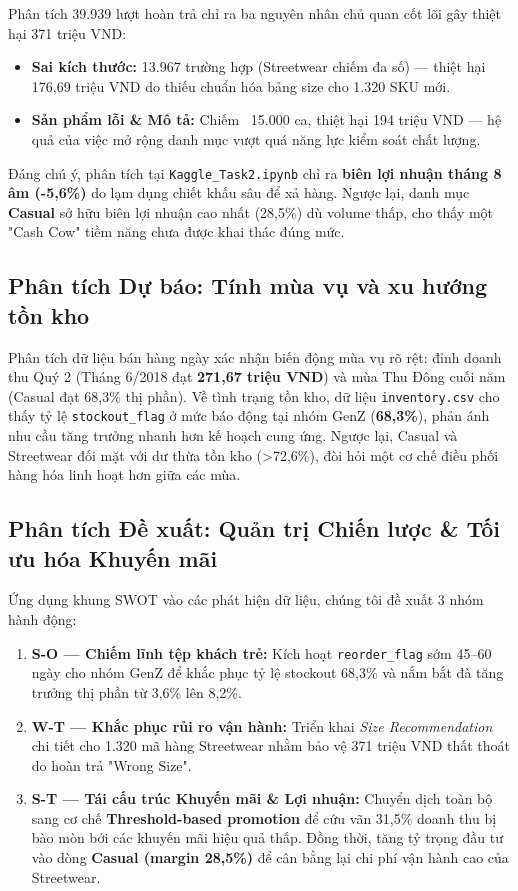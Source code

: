 \documentclass{article}
\begin{document}
Phân tích 39.939 lượt hoàn trả chỉ ra ba nguyên nhân chủ quan cốt lõi gây thiệt hại 371 triệu VND:
\begin{itemize}[leftmargin=*, nosep, topsep=1pt]
    \item \textbf{Sai kích thước:} 13.967 trường hợp (Streetwear chiếm đa số) --- thiệt hại 176,69 triệu VND do thiếu chuẩn hóa bảng size cho 1.320 SKU mới.
    \item \textbf{Sản phẩm lỗi \& Mô tả:} Chiếm ~15.000 ca, thiệt hại 194 triệu VND --- hệ quả của việc mở rộng danh mục vượt quá năng lực kiểm soát chất lượng.
\end{itemize}
Đáng chú ý, phân tích tại \texttt{Kaggle\_Task2.ipynb} chỉ ra \textbf{biên lợi nhuận tháng 8 âm (-5,6\%)} do lạm dụng chiết khấu sâu để xả hàng. Ngược lại, danh mục \textbf{Casual} sở hữu biên lợi nhuận cao nhất (28,5\%) dù volume thấp, cho thấy một "Cash Cow" tiềm năng chưa được khai thác đúng mức.

\subsection{Phân tích Dự báo: Tính mùa vụ và xu hướng tồn kho}

Phân tích dữ liệu bán hàng ngày xác nhận biến động mùa vụ rõ rệt: đỉnh doanh thu Quý 2 (Tháng 6/2018 đạt \textbf{271,67 triệu VND}) và mùa Thu Đông cuối năm (Casual đạt 68,3\% thị phần). Về tình trạng tồn kho, dữ liệu \texttt{inventory.csv} cho thấy tỷ lệ \texttt{stockout\_flag} ở mức báo động tại nhóm GenZ (\textbf{68,3\%}), phản ánh nhu cầu tăng trưởng nhanh hơn kế hoạch cung ứng. Ngược lại, Casual và Streetwear đối mặt với dư thừa tồn kho (>72,6\%), đòi hỏi một cơ chế điều phối hàng hóa linh hoạt hơn giữa các mùa.

\subsection{Phân tích Đề xuất: Quản trị Chiến lược \& Tối ưu hóa Khuyến mãi}

Ứng dụng khung SWOT vào các phát hiện dữ liệu, chúng tôi đề xuất 3 nhóm hành động:

\begin{enumerate}[leftmargin=*, noitemsep, topsep=2pt]
    \item \textbf{S-O --- Chiếm lĩnh tệp khách trẻ:} Kích hoạt \texttt{reorder\_flag} sớm 45--60 ngày cho nhóm GenZ để khắc phục tỷ lệ stockout 68,3\% và nắm bắt đà tăng trưởng thị phần từ 3,6\% lên 8,2\%.
    \item \textbf{W-T --- Khắc phục rủi ro vận hành:} Triển khai \textit{Size Recommendation} chi tiết cho 1.320 mã hàng Streetwear nhằm bảo vệ 371 triệu VND thất thoát do hoàn trả "Wrong Size".
    \item \textbf{S-T --- Tái cấu trúc Khuyến mãi \& Lợi nhuận:} Chuyển dịch toàn bộ sang cơ chế \textbf{Threshold-based promotion} để cứu vãn 31,5\% doanh thu bị bào mòn bởi các khuyến mãi hiệu quả thấp. Đồng thời, tăng tỷ trọng đầu tư vào dòng \textbf{Casual (margin 28,5\%)} để cân bằng lại chi phí vận hành cao của Streetwear.
\end{enumerate}
\end{document}
